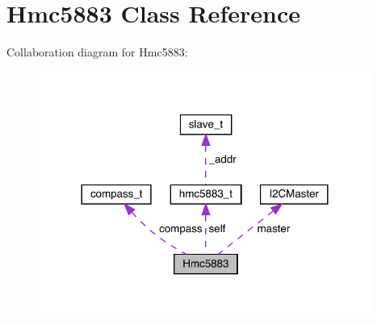 \hypertarget{classHmc5883}{}\section{Hmc5883 Class Reference}
\label{classHmc5883}


Collaboration diagram for Hmc5883\+:\nopagebreak
\begin{figure}[H]
\begin{center}
\leavevmode
\includegraphics[width=308pt]{classHmc5883__coll__graph}
\end{center}
\end{figure}
